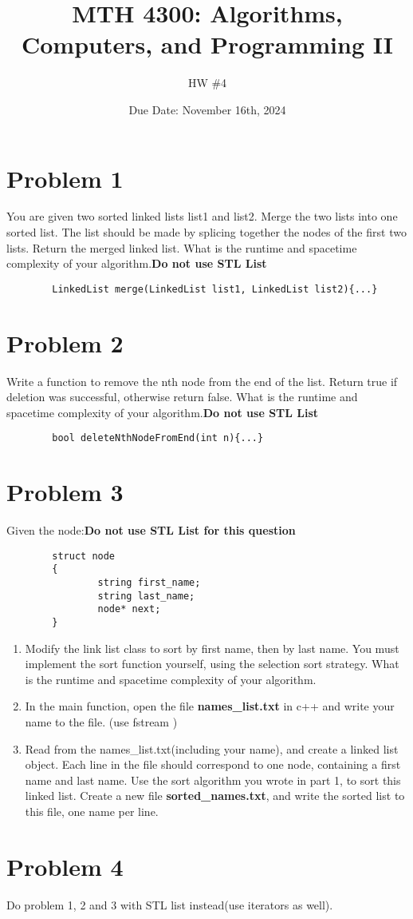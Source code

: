 \documentclass[a4paper]{article}
\title{MTH 4300: Algorithms, Computers, and Programming II}
\author{HW \#4}
\date{Due Date: November 16th, 2024}
\begin{document}
\maketitle


\section*{Problem 1}
You are given two sorted linked lists list1 and list2.
Merge the two lists into one sorted list. The list should be made by splicing together the nodes of the first two lists.
Return  the merged linked list. What is the runtime and spacetime complexity of your algorithm.\textbf{Do not use STL List}
\begin{verbatim}
        LinkedList merge(LinkedList list1, LinkedList list2){...}
\end{verbatim} 


\section*{Problem 2}
Write a function to remove the nth node from the end of the list.  
Return true if deletion was successful, otherwise return false.
What is the runtime and spacetime complexity of your algorithm.\textbf{Do not use STL List}
\begin{verbatim}
        bool deleteNthNodeFromEnd(int n){...}
\end{verbatim}


\section*{Problem 3}
Given the node:\textbf{Do not use STL List for this question}
\begin{verbatim}
        struct node
        {
                string first_name;
                string last_name;
                node* next;
        }
\end{verbatim}
\begin{enumerate}
        \item Modify the link list class to sort by first name, then by last name. 
        You must implement the sort function yourself, using the selection sort strategy.
        What is the runtime and spacetime complexity of your algorithm.
        \item In the main function, open the file \textbf{names\_list.txt} in c++ and write your name to the file. (use fstream )
        \item Read from the names\_list.txt(including your name), and create a linked list object. Each line in the file should
              correspond to one node, containing a first name and last name. Use the sort algorithm you wrote in part 1, to sort this linked list.
              Create a new file \textbf{sorted\_names.txt}, and write the sorted list to this file, one name per line. 
\end{enumerate}



\section*{Problem 4}
Do problem 1, 2 and 3 with STL list instead(use iterators as well).
\end{document}
